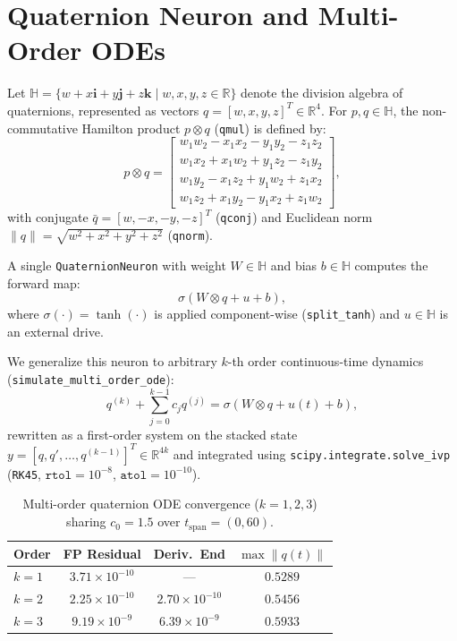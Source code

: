 \documentclass[11pt,twocolumn]{article}
\begin{document}
\section{Quaternion Neuron and Multi-Order ODEs}
Let $\mathbb{H} = \{w + x\mathbf{i} + y\mathbf{j} + z\mathbf{k} \mid w,x,y,z \in \mathbb{R}\}$ denote the division algebra of quaternions, represented as vectors $q = [w, x, y, z]^T \in \mathbb{R}^4$. For $p, q \in \mathbb{H}$, the non-commutative Hamilton product $p \otimes q$ (\texttt{qmul}) is defined by:
\begin{equation}
p \otimes q = \begin{bmatrix}
w_1 w_2 - x_1 x_2 - y_1 y_2 - z_1 z_2 \\
w_1 x_2 + x_1 w_2 + y_1 z_2 - z_1 y_2 \\
w_1 y_2 - x_1 z_2 + y_1 w_2 + z_1 x_2 \\
w_1 z_2 + x_1 y_2 - y_1 x_2 + z_1 w_2
\end{bmatrix},
\end{equation}
with conjugate $\bar{q} = [w, -x, -y, -z]^T$ (\texttt{qconj}) and Euclidean norm $\|q\| = \sqrt{w^2 + x^2 + y^2 + z^2}$ (\texttt{qnorm}).

A single \texttt{QuaternionNeuron} with weight $W \in \mathbb{H}$ and bias $b \in \mathbb{H}$ computes the forward map:
\begin{equation}
\sigma(W \otimes q + u + b),
\end{equation}
where $\sigma(\cdot) = \tanh(\cdot)$ is applied component-wise (\texttt{split\_tanh}) and $u \in \mathbb{H}$ is an external drive.

We generalize this neuron to arbitrary $k$-th order continuous-time dynamics (\texttt{simulate\_multi\_order\_ode}):
\begin{equation}
q^{(k)} + \sum_{j=0}^{k-1} c_j q^{(j)} = \sigma(W \otimes q + u(t) + b),
\end{equation}
rewritten as a first-order system on the stacked state $y = [q, q', \dots, q^{(k-1)}]^T \in \mathbb{R}^{4k}$ and integrated using \texttt{scipy.integrate.solve\_ivp} (\texttt{RK45}, $\texttt{rtol}=10^{-8}$, $\texttt{atol}=10^{-10}$).

\begin{table}[t]
\centering
\caption{Multi-order quaternion ODE convergence ($k=1,2,3$) sharing $c_0 = 1.5$ over $t_{\text{span}} = (0, 60)$.}
\label{tab:multi_order_ode}
\small
\setlength{\tabcolsep}{4pt}
\begin{tabular}{@{}lccc@{}}
\hline
Order & FP Residual & Deriv.\ End & $\max \|q(t)\|$ \\
\hline
$k=1$ & $3.71 \times 10^{-10}$ & --- & $0.5289$ \\
$k=2$ & $2.25 \times 10^{-10}$ & $2.70 \times 10^{-10}$ & $0.5456$ \\
$k=3$ & $9.19 \times 10^{-9}$  & $6.39 \times 10^{-9}$  & $0.5933$ \\
\hline
\end{tabular}
\end{table}
\end{document}
